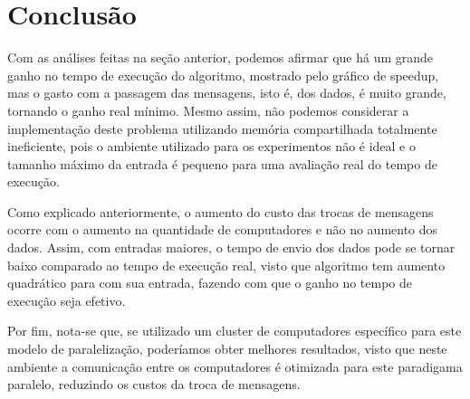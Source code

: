 \documentclass[12pt]{article}
\begin{document}
\section{Conclusão}

Com as análises feitas na seção anterior, podemos afirmar que há um grande ganho no tempo de execução do algoritmo, mostrado pelo gráfico de speedup, mas o gasto com a passagem das mensagens, isto é, dos dados, é muito grande, tornando o ganho real mínimo. Mesmo assim, não podemos considerar a implementação deste problema utilizando memória compartilhada totalmente ineficiente, pois o ambiente utilizado para os experimentos não é ideal e o tamanho máximo da entrada é pequeno para uma avaliação real do tempo de execução.

Como explicado anteriormente, o aumento do custo das trocas de mensagens ocorre com o aumento na quantidade de computadores e não no aumento dos dados. Assim, com entradas maiores, o tempo de envio dos dados pode se tornar baixo comparado ao tempo de execução real, visto que algoritmo tem aumento quadrático para com sua entrada, fazendo com que o ganho no tempo de execução seja efetivo.

Por fim, nota-se que, se utilizado um cluster de computadores específico para este modelo de paralelização, poderíamos obter melhores resultados, visto que neste ambiente a comunicação entre os computadores é otimizada para este paradigama paralelo, reduzindo os custos da troca de mensagens.



\end{document}
